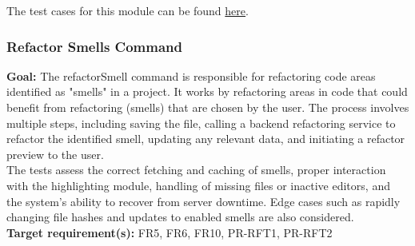 \documentclass[12pt, titlepage]{article}
\begin{document}
  \noindent The test cases for this module can be found
  \href{https://github.com/ssm-lab/capstone--sco-vs-code-plugin/blob/plugin-multi-file/test/commands/detectSmells.test.ts}{here}.

  \subsubsection{Refactor Smells Command}

  \textbf{Goal:} The refactorSmell command is responsible for
  refactoring code areas identified as "smells" in a project. It
  works by refactoring areas in code that could benefit from
  refactoring (smells) that are chosen by the user. The process
  involves multiple steps, including saving the file, calling a
  backend refactoring service to refactor the identified smell,
  updating any relevant data, and initiating a refactor preview to the user.\\

  \noindent The tests assess the correct fetching and caching of
  smells, proper interaction with the highlighting module, handling
  of missing files or inactive editors, and the system's ability to
  recover from server downtime. Edge cases such as rapidly changing
  file hashes and updates to enabled smells are also considered.\\

  \noindent\textbf{Target requirement(s):} FR5, FR6, FR10, PR-RFT1,
  PR-RFT2 ~\cite{SRS} \\
\end{document}
